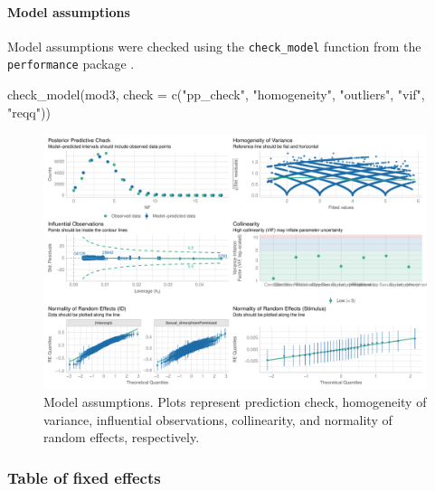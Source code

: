 \documentclass[
  bookmarksnumbered]{article}
\newenvironment{Shaded}{\begin{snugshade}}{\end{snugshade}}
\newcommand{\AttributeTok}[1]{\textcolor[rgb]{0.80,0.80,0.80}{#1}}
\newcommand{\FunctionTok}[1]{\textcolor[rgb]{0.94,0.94,0.56}{#1}}
\newcommand{\NormalTok}[1]{\textcolor[rgb]{0.80,0.80,0.80}{#1}}
\newcommand{\OtherTok}[1]{\textcolor[rgb]{0.94,0.94,0.56}{#1}}
\newcommand{\SpecialCharTok}[1]{\textcolor[rgb]{0.86,0.64,0.64}{#1}}
\newcommand{\StringTok}[1]{\textcolor[rgb]{0.80,0.58,0.58}{#1}}
\begin{document}
\paragraph{Model assumptions}\label{model-assumptions-2}

Model assumptions were checked using the \texttt{check\_model} function from the \texttt{performance} package \autocite{ludecke2021}.

\begin{Shaded}
\begin{Highlighting}[]
\FunctionTok{check\_model}\NormalTok{(mod3, }\AttributeTok{check =} \FunctionTok{c}\NormalTok{(}\StringTok{"pp\_check"}\NormalTok{, }\StringTok{"homogeneity"}\NormalTok{, }\StringTok{"outliers"}\NormalTok{, }\StringTok{"vif"}\NormalTok{, }\StringTok{"reqq"}\NormalTok{))}
\end{Highlighting}
\end{Shaded}

\begin{figure}
\centering
\includegraphics{Supplementary_material_files/figure-latex/assu-mod3-1.pdf}
\caption{\label{fig:assu-mod3}Model assumptions. Plots represent prediction check, homogeneity of variance, influential observations, collinearity, and normality of random effects, respectively.}
\end{figure}

\subsubsection{Table of fixed effects}\label{table-of-fixed-effects-2}

\begin{Shaded}
\end{Shaded}
\end{document}
